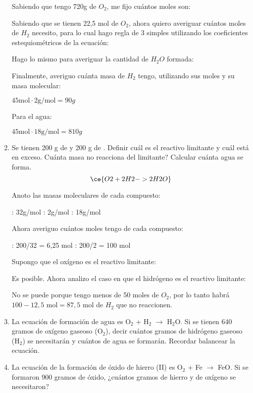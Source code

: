 \begin{enumerate}
\skipline
Sabiendo que tengo 720g de $O_2$, me fijo cuántos moles son:

Sabiendo que se tienen 22,5 mol de $O_2$, ahora quiero averiguar cuántos moles de $H_2$ necesito, para lo cual hago regla de 3 simples utilizando los coeficientes estequiométricos de la ecuación:

Hago lo mismo para averiguar la cantidad de $H_2O$ formada:

Finalmente, averiguo cuánta masa de $H_2$ tengo, utilizando sus moles y su masa molecular:

$45 \text{mol} \cdot 2\text{g/mol} = 90 g$

Para el agua:

$45 \text{mol} \cdot 18\text{g/mol} = 810g$


\item 
Se tienen 200 g de  y 200 g de .
Definir cuál es el reactivo limitante y cuál está en exceso.
Cuánta masa no reacciona del limitante?
Calcular cuánta agua se forma.
$$\ce{O2 + 2H2 -> 2H2O}$$

Anoto las masas moleculares de cada compuesto:

\hfil{}: 32g/mol\hfil
{}: 2g/mol\hfil
{}: 18g/mol\hfil

\skipline
Ahora averiguo cuántos moles tengo de cada compuesto:

\hfil{}: 200/32 = 6,25 mol\hfil
{}: 200/2 = 100 mol\hfil

\skipline
Supongo que el oxígeno es el reactivo limitante:

Es posible. Ahora analizo el caso en que el hidrógeno es el reactivo limitante:

No se puede porque tengo menos de 50 moles de $O_2$, por lo tanto habrá $100-12,5 \text{ mol} = 87,5 \text{ mol}$ de $H_2$ que no reaccionen.


\item La ecuación de formación de agua es O$_2$ + H$_2$ $\longrightarrow$ H$_2$O. Si se tienen 640 gramos de oxígeno gaseoso (O$_2$), decir cuántos gramos de hidrógeno gaseoso (H$_2$) se necesitarán y cuántos de agua se formarán. Recordar balancear la ecuación.

\item La ecuación de la formación de óxido de hierro (II) es O$_2$ + Fe $\longrightarrow$ FeO. Si se formaron 900 gramos de óxido, ¿cuántos gramos de hierro y de oxígeno se necesitaron?


\end{enumerate}
